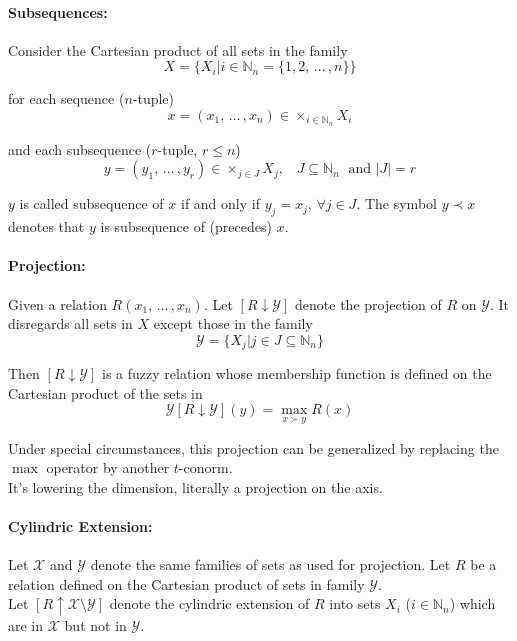 \newpage

\paragraph{Subsequences:} Consider the Cartesian product of all sets in the family
$$ X = \{X_i | i \in \mathbb{N}_n = \{1,2, \, \dots \, , n\} \}$$

for each sequence ($n$-tuple)
$$ x = (x_1, \, \dots \, , x_n) \in \times_{i \in \mathbb{N}_n} X_i $$

and each subsequence ($r$-tuple, $r \leq n$)
$$ y = (y_1, \, \dots \, , y_r) \in \times_{j \in J} X_j, \;\;\; J \subseteq \mathbb{N}_n \; \text{ and } |J| = r $$

$y$ is called subsequence of $x$ if and only if $y_j = x_j$, $\forall j \in J$. The symbol $y \prec x$ denotes that $y$ is subsequence of (precedes) $x$.\\

\paragraph{Projection:} Given a relation $R(x_1, \, \dots \, , x_n)$. Let $\left[R \downarrow \mathcal{Y}\right]$ denote the projection of $R$ on $\mathcal{Y}$. It disregards all sets in $X$ except those in the family
$$ \mathcal{Y} = \{X_j | j \in J \subseteq \mathbb{N}_n \} $$

Then $\left[R \downarrow \mathcal{Y}\right]$ is a fuzzy relation whose membership function is defined on the Cartesian product of the sets in 
$$ \mathcal{Y} \left[R \downarrow \mathcal{Y}\right] (y) = \max_{x \succ y} R(x) $$

Under special circumstances, this projection can be generalized by replacing the $\max$ operator by another $t$-conorm.\\

It's lowering the dimension, literally a projection on the axis.\\

\newpage

\paragraph{Cylindric Extension:} Let $\mathcal{X}$ and $\mathcal{Y}$ denote the same families of sets as used for projection. Let $R$ be a relation defined on the Cartesian product of sets in family $\mathcal{Y}$.\\
Let $[R \uparrow \mathcal{X} \setminus \mathcal{Y}]$ denote the cylindric extension of $R$ into sets $X_i$ ($i \in \mathbb{N}_n$) which are in $\mathcal{X}$ but not in $\mathcal{Y}$.\\

